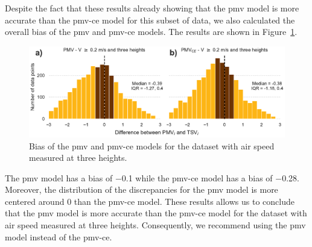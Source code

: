 Despite the fact that these results already showing that the \ac{pmv} model is more accurate than the \ac{pmv-ce} model for this subset of data, we also calculated the overall bias of the \ac{pmv} and \ac{pmv-ce} models.
The results are shown in Figure~\ref{fig:hist_discrepancies_three_heights}.
\begin{figure}[htb!]
    \centering
    \includegraphics[width=\textwidth]{figures/hist_discrepancies_three_heights}
    \caption{Bias of the \ac{pmv} and \ac{pmv-ce} models for the dataset with air speed measured at three heights.}
    \label{fig:hist_discrepancies_three_heights}
\end{figure}
The \ac{pmv} model has a bias of \num{-.1} while the \ac{pmv-ce} model has a bias of \num{-.28}.
Moreover, the distribution of the discrepancies for the \ac{pmv} model is more centered around \num{0} than the \ac{pmv-ce} model.
These results allows us to conclude that the \ac{pmv} model is more accurate than the \ac{pmv-ce} model for the dataset with air speed measured at three heights.
Consequently, we recommend using the \ac{pmv} model instead of the \ac{pmv-ce}.

